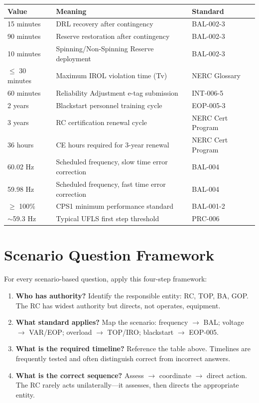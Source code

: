 \documentclass[12pt,twoside,openright]{memoir}
\begin{document}
\begin{center}
\begin{tabular}{@{}lll@{}}
\toprule
\rowcolor{nercblue!15}
\textbf{Value} & \textbf{Meaning} & \textbf{Standard} \\
\midrule
15 minutes & DRL recovery after contingency & BAL-002-3 \\
\rowcolor{rowlight}
90 minutes & Reserve restoration after contingency & BAL-002-3 \\
10 minutes & Spinning/Non-Spinning Reserve deployment & BAL-002-3 \\
\rowcolor{rowlight}
$\leq$ 30 minutes & Maximum IROL violation time (Tv) & NERC Glossary \\
60 minutes & Reliability Adjustment e-tag submission & INT-006-5 \\
\rowcolor{rowlight}
2 years & Blackstart personnel training cycle & EOP-005-3 \\
3 years & RC certification renewal cycle & NERC Cert Program \\
\rowcolor{rowlight}
36 hours & CE hours required for 3-year renewal & NERC Cert Program \\
60.02 Hz & Scheduled frequency, slow time error correction & BAL-004 \\
\rowcolor{rowlight}
59.98 Hz & Scheduled frequency, fast time error correction & BAL-004 \\
$\geq$ 100\% & CPS1 minimum performance standard & BAL-001-2 \\
\rowcolor{rowlight}
$\sim$59.3 Hz & Typical UFLS first step threshold & PRC-006 \\
\bottomrule
\end{tabular}
\end{center}

\section{Scenario Question Framework}

For every scenario-based question, apply this four-step framework:
\begin{enumerate}
  \item \textbf{Who has authority?} Identify the responsible entity: RC, TOP, BA, GOP.
        The RC has widest authority but directs, not operates, equipment.
  \item \textbf{What standard applies?} Map the scenario: frequency $\to$ BAL; voltage
        $\to$ VAR/EOP; overload $\to$ TOP/IRO; blackstart $\to$ EOP-005.
  \item \textbf{What is the required timeline?} Reference the table above. Timelines are
        frequently tested and often distinguish correct from incorrect answers.
  \item \textbf{What is the correct sequence?} Assess $\to$ coordinate $\to$ direct action.
        The RC rarely acts unilaterally—it assesses, then directs the appropriate entity.
\end{enumerate}
\end{document}
